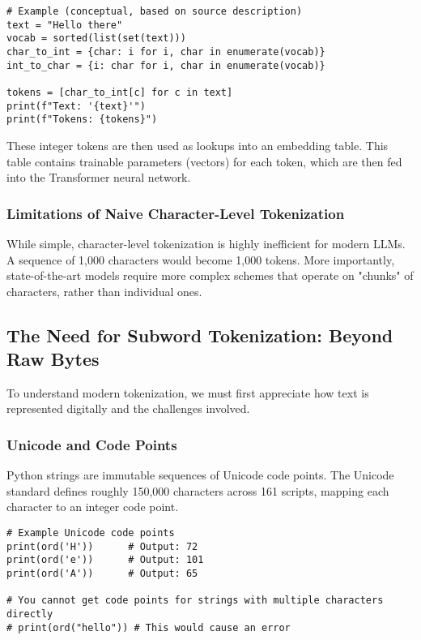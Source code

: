 \begin{lstlisting}[caption={Character-level tokenization example}]
# Example (conceptual, based on source description)
text = "Hello there"
vocab = sorted(list(set(text))) 
char_to_int = {char: i for i, char in enumerate(vocab)}
int_to_char = {i: char for i, char in enumerate(vocab)}

tokens = [char_to_int[c] for c in text]
print(f"Text: '{text}'")
print(f"Tokens: {tokens}")
\end{lstlisting}

These integer tokens are then used as lookups into an embedding table. This table contains trainable parameters (vectors) for each token, which are then fed into the Transformer neural network.

\subsubsection{Limitations of Naive Character-Level Tokenization}
While simple, character-level tokenization is highly inefficient for modern LLMs. A sequence of 1,000 characters would become 1,000 tokens. More importantly, state-of-the-art models require more complex schemes that operate on "chunks" of characters, rather than individual ones.

\subsection{The Need for Subword Tokenization: Beyond Raw Bytes}

To understand modern tokenization, we must first appreciate how text is represented digitally and the challenges involved.

\subsubsection{Unicode and Code Points}
Python strings are immutable sequences of Unicode code points. The Unicode standard defines roughly 150,000 characters across 161 scripts, mapping each character to an integer code point.

\begin{lstlisting}[caption={Getting Unicode Code Points in Python}]
# Example Unicode code points
print(ord('H'))      # Output: 72
print(ord('e'))      # Output: 101  
print(ord('A'))      # Output: 65

# You cannot get code points for strings with multiple characters directly
# print(ord("hello")) # This would cause an error
\end{lstlisting}

